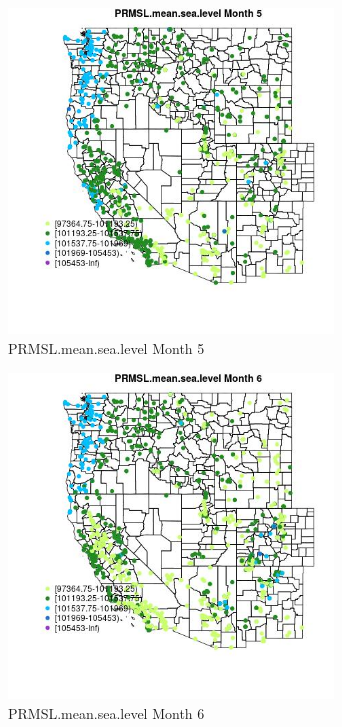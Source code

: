 \begin{figure} 
\centering  
\includegraphics[width=0.77\textwidth]{Code_Outputs/Report_ML_input_PM25_Step4_part_f_de_duplicated_aves_prioritize_24hr_obswNAs_MapObsMo5PRMSLmeansealevel.jpg} 
\caption{\label{fig:Report_ML_input_PM25_Step4_part_f_de_duplicated_aves_prioritize_24hr_obswNAsMapObsMo5PRMSLmeansealevel}PRMSL.mean.sea.level Month 5} 
\end{figure} 
 

\begin{figure} 
\centering  
\includegraphics[width=0.77\textwidth]{Code_Outputs/Report_ML_input_PM25_Step4_part_f_de_duplicated_aves_prioritize_24hr_obswNAs_MapObsMo6PRMSLmeansealevel.jpg} 
\caption{\label{fig:Report_ML_input_PM25_Step4_part_f_de_duplicated_aves_prioritize_24hr_obswNAsMapObsMo6PRMSLmeansealevel}PRMSL.mean.sea.level Month 6} 
\end{figure} 
 


